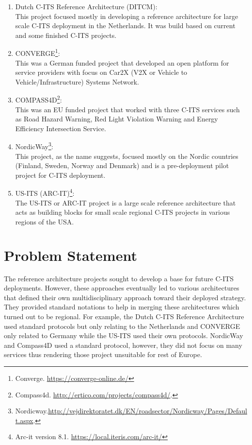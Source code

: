 \documentclass[conference]{IEEEtran}
\begin{document}
\begin{enumerate}
	\item Dutch C-ITS Reference Architecture (DITCM)\cite{ditcm}\cite{ditcmits}:\\
		This project focused mostly in developing a reference architecture for large scale C-ITS deployment in the Netherlands. It was build based on current and some finished C-ITS projects.
	\item CONVERGE\footnote{\label{converge}Converge. \url{https://converge-online.de/}}: \\
		This was a German funded project that developed an open platform for service providers with focus on Car2X (V2X or Vehicle to Vehicle/Infrastructure) Systems Network.
	\item COMPASS4D\footnote{\label{compass4d}Compass4d. \url{http://ertico.com/projects/compass4d/}.}:\\
	This was an EU funded project that worked with three C-ITS services such as Road Hazard Warning, Red Light Violation Warning and Energy Efficiency Intersection Service.
	\item NordicWay\footnote{\label{nordicway}Nordicway.\url{http://vejdirektoratet.dk/EN/roadsector/Nordicway/Pages/Default.aspx}.}:\\
	This project, as the name suggests, focused mostly on the Nordic countries (Finland, Sweden, Norway and Denmark) and is a pre-deployment pilot project for  C-ITS deployment.
	\item US-ITS (ARC-IT)\footnote{\label{arcit}Arc-it version 8.1. \url{https://local.iteris.com/arc-it/}}:\\
	The US-ITS or ARC-IT project is a large scale reference architecture that acts as building blocks for small scale regional C-ITS projects in various regions of the USA.

\end{enumerate}

\section{Problem Statement}
The reference architecture projects sought to develop a base for future C-ITS deployments. However, these approaches eventually led to various architectures that defined their own multidisciplinary approach toward their deployed strategy. They provided standard notations to help in merging these architectures which turned out to be regional. For example, the Dutch C-ITS Reference Architecture used standard protocols but only relating to the Netherlands and CONVERGE only related to Germany while the US-ITS used their own protocols. NordicWay and Compass4D used a standard protocol, however, they did not focus on many services thus rendering those project unsuitable for rest of Europe.
\end{document}
